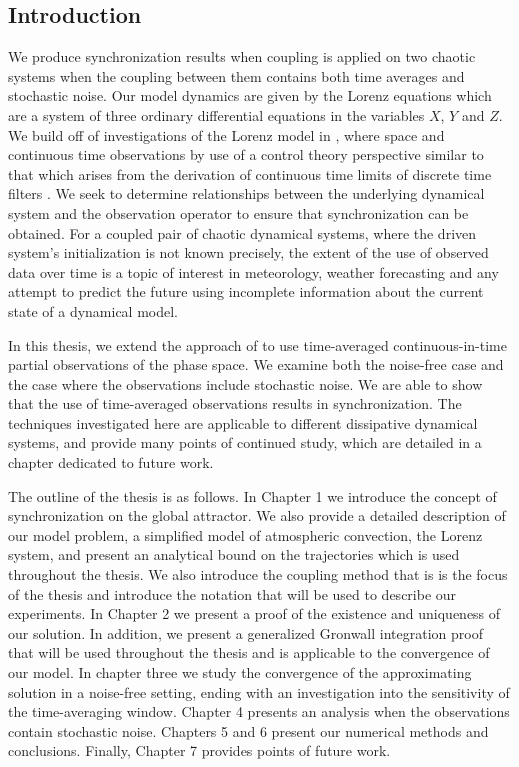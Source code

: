 \documentclass[master,tocprelim,12pt]{unrthesis}
\theoremstyle{definition}
\numberwithin{equation}{chapter}
\begin{document}
\begin{manuscript}
\chapter{Introduction}\label{Intro}

We produce synchronization results when coupling is applied on 
two chaotic systems when the coupling
between them contains both time averages and stochastic noise.
Our model dynamics are given by the Lorenz equations
which are a system of three ordinary differential
equations in the variables $X$, $Y$ and $Z$.
We build off of investigations of the Lorenz model in 
\cite{Hayden11, Stuart14}, where 
space and continuous time observations \cite{Olson14} by use of a control
theory perspective similar to that which arises from the derivation of
continuous time limits of discrete time filters \cite{ Bloemker14}. 
We seek to determine relationships between the underlying
dynamical system and the observation operator
to ensure that synchronization can be obtained.
For a coupled pair of chaotic dynamical systems,
where the driven system's initialization is not known precisely, the extent 
of the use of observed data over time is a topic of interest in 
meteorology, weather forecasting and any attempt to predict the 
future using incomplete information about the current state of a
dynamical model.

In this thesis, we extend the approach of \cite{Olson14}
to use time-averaged continuous-in-time partial observations of 
the phase space. We examine
both the noise-free case and the case where the observations include
stochastic noise. We are able to show that the use of time-averaged
observations results in synchronization.
The techniques investigated here are applicable to different
dissipative dynamical systems, and
provide many points of continued study, which
are detailed in a chapter dedicated to future work.

The outline of the thesis is as follows. In Chapter 1 we introduce the concept
of synchronization on the global attractor. We also provide a
detailed description of our model problem, a simplified model of atmospheric
convection, the Lorenz system, and present an analytical bound on the
trajectories which is used throughout the thesis. We also introduce the coupling
method that is is the focus of the thesis and introduce the notation that will
be used to describe our experiments.
In Chapter 2 we present a proof of the
existence and uniqueness of our solution. In addition, we present a generalized
Gronwall integration proof that will be used throughout the thesis and is
applicable to the convergence of our model. 
In chapter three we study the convergence of the approximating solution in a noise-free 
setting, ending with an investigation into the sensitivity of the time-averaging
window. Chapter 4 presents an analysis when the observations contain stochastic noise. 
Chapters 5 and 6 present our numerical methods and conclusions. Finally, Chapter
7 provides points of future work.


\end{manuscript}
\end{document}
